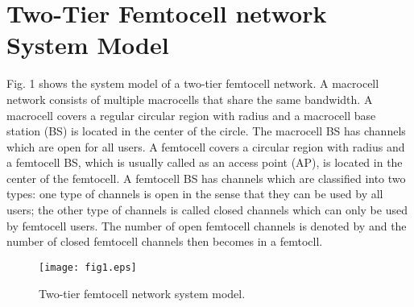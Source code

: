 \documentclass[10pt,final,journal,letterpaper,twoside,twocolumn]{IEEEtran}
\begin{document}
\section{Two-Tier Femtocell network System Model}
\label{sec2}

Fig. 1 shows the system model of a two-tier femtocell network. A macrocell
network consists of multiple macrocells that share the same bandwidth. A
macrocell covers a regular circular region  with radius   and a
macrocell base station (BS) is located in the center of the circle. The macrocell BS has
 channels which are open for all users. A femtocell covers a circular region   with radius  and a femtocell BS, which is usually called as an access point (AP), is located in the center of the femtocell. A femtocell BS has  channels
which are classified into two types: one type of channels is open in the
sense that they can be used by all users; the other type of channels is
called closed channels which can only be used by femtocell users. The number
of open femtocell channels is denoted by  and the number of
closed femtocell channels then becomes  in a femtocll.

\begin{figure}
\vspace{0.1in}
\centerline{\texttt{[image: fig1.eps]}}
\caption{\small Two-tier femtocell network system model.}
\end{figure}
\end{document}
